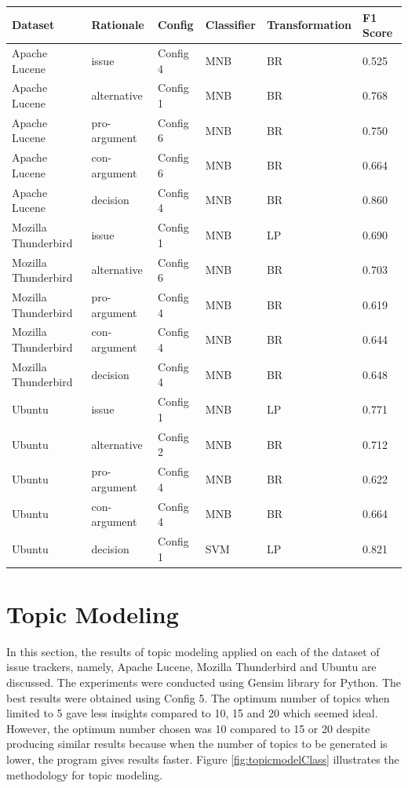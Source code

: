 \documentclass[a4paper,12pt,twoside]{report}
\begin{document}
\begin{table} %
    \centering
    \begin{adjustbox}{max width=\columnwidth}
    \def\arraystretch{1} %
    \begin{tabular}{p{4cm} p{3cm} p{2cm} p{2cm} p{3cm} p{3cm}}
        \toprule
        \textbf{Dataset} & \textbf{Rationale} & \textbf{Config} & \textbf{Classifier} & \textbf{Transformation} & \textbf{F1 Score}\\
        \midrule
			Apache Lucene & issue & Config 4 & MNB & BR & 0.525 \\
			Apache Lucene & alternative & Config 1 & MNB & BR & 0.768 \\
			Apache Lucene & pro-argument & Config 6 & MNB & BR & 0.750 \\
			Apache Lucene & con-argument & Config 6 & MNB & BR & 0.664 \\
			Apache Lucene & decision & Config 4 & MNB & BR & 0.860 \\
		\midrule
			Mozilla Thunderbird & issue & Config 1 & MNB & LP & 0.690 \\ 
			Mozilla Thunderbird & alternative & Config 6 & MNB & BR & 0.703 \\ 
			Mozilla Thunderbird & pro-argument & Config 4 & MNB & BR & 0.619 \\ 
			Mozilla Thunderbird & con-argument & Config 4 & MNB & BR & 0.644 \\ 			
			Mozilla Thunderbird & decision & Config 4 & MNB & BR & 0.648 \\ 
		\midrule
			Ubuntu & issue & Config 1 & MNB & LP & 0.771 \\
			Ubuntu & alternative & Config 2 & MNB & BR & 0.712 \\
			Ubuntu & pro-argument & Config 4 & MNB & BR & 0.622 \\
			Ubuntu & con-argument & Config 4 & MNB & BR & 0.664 \\
			Ubuntu & decision & Config 1 & SVM & LP & 0.821 \\
        \midrule
    \end{tabular}
    \end{adjustbox}
    \label{tab:summaryFGC}
\end{table}

\section{Topic Modeling}
In this section, the results of topic modeling applied on each of the dataset of issue trackers, namely, Apache Lucene, Mozilla Thunderbird and Ubuntu are discussed. The experiments were conducted using Gensim library for Python. The best results were obtained using Config 5. The optimum number of topics when limited to 5 gave less insights compared to 10, 15 and 20 which seemed ideal. However, the optimum number chosen was 10 compared to 15 or 20 despite producing similar results because when the number of topics to be generated is lower, the program gives results faster. Figure \ref{fig:topicmodelClass} illustrates the methodology for topic modeling. 
\end{document}
